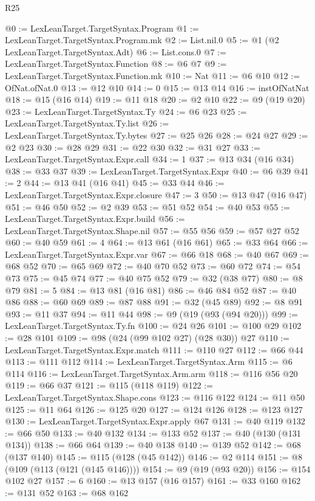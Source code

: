 \begin{lexlean}{R25}
\begin{coremodule}
@0 := LexLeanTarget.TargetSyntax.Program
@1 := LexLeanTarget.TargetSyntax.Program.mk
@2 := List.nil.{0}
@5 := @1 (@2 LexLeanTarget.TargetSyntax.Adt)
@6 := List.cons.{0}
@7 := LexLeanTarget.TargetSyntax.Function
@8 := @6 @7
@9 := LexLeanTarget.TargetSyntax.Function.mk
@10 := Nat
@11 := @6 @10
@12 := OfNat.ofNat.{0}
@13 := @12 @10
@14 := 0
@15 := @13 @14
@16 := instOfNatNat
@18 := @15 (@16 @14)
@19 := @11 @18
@20 := @2 @10
@22 := @9 (@19 @20)
@23 := LexLeanTarget.TargetSyntax.Ty
@24 := @6 @23
@25 := LexLeanTarget.TargetSyntax.Ty.list
@26 := LexLeanTarget.TargetSyntax.Ty.bytes
@27 := @25 @26
@28 := @24 @27
@29 := @2 @23
@30 := @28 @29
@31 := @22 @30
@32 := @31 @27
@33 := LexLeanTarget.TargetSyntax.Expr.call
@34 := 1
@37 := @13 @34 (@16 @34)
@38 := @33 @37
@39 := LexLeanTarget.TargetSyntax.Expr
@40 := @6 @39
@41 := 2
@44 := @13 @41 (@16 @41)
@45 := @33 @44
@46 := LexLeanTarget.TargetSyntax.Expr.closure
@47 := 3
@50 := @13 @47 (@16 @47)
@51 := @46 @50
@52 := @2 @39
@53 := @51 @52
@54 := @40 @53
@55 := LexLeanTarget.TargetSyntax.Expr.build
@56 := LexLeanTarget.TargetSyntax.Shape.nil
@57 := @55 @56
@59 := @57 @27 @52
@60 := @40 @59
@61 := 4
@64 := @13 @61 (@16 @61)
@65 := @33 @64
@66 := LexLeanTarget.TargetSyntax.Expr.var
@67 := @66 @18
@68 := @40 @67
@69 := @68 @52
@70 := @65 @69
@72 := @40 @70 @52
@73 := @60 @72
@74 := @54 @73
@75 := @45 @74
@77 := @40 @75 @52
@79 := @32 (@38 @77)
@80 := @8 @79
@81 := 5
@84 := @13 @81 (@16 @81)
@86 := @46 @84 @52
@87 := @40 @86
@88 := @60 @69
@89 := @87 @88
@91 := @32 (@45 @89)
@92 := @8 @91
@93 := @11 @37
@94 := @11 @44
@98 := @9 (@19 (@93 (@94 @20)))
@99 := LexLeanTarget.TargetSyntax.Ty.fn
@100 := @24 @26
@101 := @100 @29
@102 := @28 @101
@109 := @98 (@24 (@99 @102 @27) (@28 @30)) @27
@110 := LexLeanTarget.TargetSyntax.Expr.match
@111 := @110 @27
@112 := @66 @44
@113 := @111 @112
@114 := LexLeanTarget.TargetSyntax.Arm
@115 := @6 @114
@116 := LexLeanTarget.TargetSyntax.Arm.arm
@118 := @116 @56 @20
@119 := @66 @37
@121 := @115 (@118 @119)
@122 := LexLeanTarget.TargetSyntax.Shape.cons
@123 := @116 @122
@124 := @11 @50
@125 := @11 @64
@126 := @125 @20
@127 := @124 @126
@128 := @123 @127
@130 := LexLeanTarget.TargetSyntax.Expr.apply @67
@131 := @40 @119
@132 := @66 @50
@133 := @40 @132
@134 := @133 @52
@137 := @40 (@130 (@131 @134))
@138 := @66 @64
@139 := @40 @138
@140 := @139 @52
@142 := @68 (@137 @140)
@145 := @115 (@128 (@45 @142))
@146 := @2 @114
@151 := @8 (@109 (@113 (@121 (@145 @146))))
@154 := @9 (@19 (@93 @20))
@156 := @154 @102 @27
@157 := 6
@160 := @13 @157 (@16 @157)
@161 := @33 @160
@162 := @131 @52
@163 := @68 @162

\end{coremodule}
\end{lexlean}
